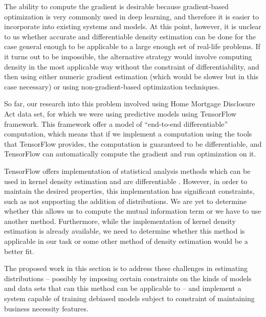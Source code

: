 The ability to compute the gradient is desirable because gradient-based
optimization is very commonly used in deep learning\cite{Goodfellow-et-al-2016},
and therefore it is easier to incorporate into existing systems and models. At
this point, however, it is unclear to us whether accurate and differentiable
density estimation can be done for the case general enough to be applicable to a
large enough set of real-life problems. If it turns out to be impossible, the
alternative strategy would involve computing density in the most applicable way
without the constraint of differentiability, and then using either numeric
gradient estimation (which would be slower but in this case necessary) or using
non-gradient-based optimization techniques.

So far, our research into this problem involved using Home Mortgage Disclosure
Act data set\cite{data-hmda}, for which we were
using predictive models using TensorFlow framework. This framework offer a model
of ``end-to-end differentiable'' computation, which means that if we implement a
computation using the tools that TensorFlow provides, the computation is
guaranteed to be differentiable, and TensorFlow can automatically compute the
gradient and run optimization on it.

TensorFlow offers implementation of statistical analysis methods
which can be used in kernel density estimation and are differentiable
\cite{171110604}. However, in order to maintain the desired properties, this
implementation has significant constraints, such as not supporting the addition
of distributions. We are yet to determine whether this allows us to compute the
mutual information term or we have to use another method. Furthermore, while the
implementation of kernel density estimation is already available, we need to
determine whether this method is applicable in our task or some other method of
density estimation would be a better fit.

The proposed work in this section is to address these challenges in estimating
distributions -- possibly by imposing certain constraints on the kinds of models
and data sets that can this method can be applicable to -- and implement a
system capable of training debiased models subject to constraint of maintaining
business necessity features.

